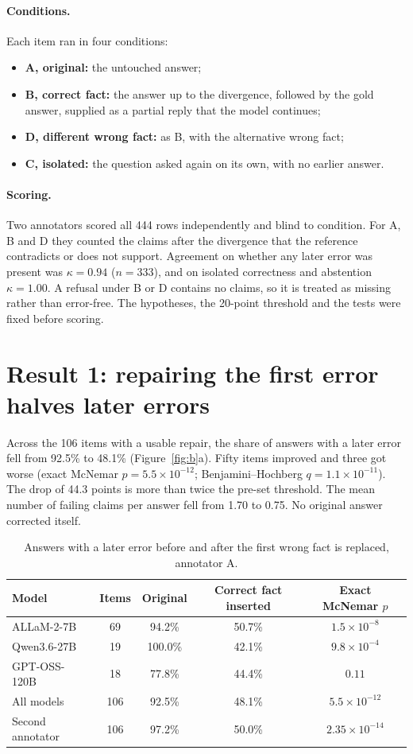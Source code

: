 \documentclass[11pt,a4paper,oneside]{report}
\newcommand{\sci}[2]{#1\times10^{#2}}
\begin{document}
\paragraph{Conditions.} Each item ran in four conditions:
\begin{itemize}
\item \textbf{A, original:} the untouched answer;
\item \textbf{B, correct fact:} the answer up to the divergence, followed by the gold answer, supplied as a partial reply that the model continues;
\item \textbf{D, different wrong fact:} as B, with the alternative wrong fact;
\item \textbf{C, isolated:} the question asked again on its own, with no earlier answer.
\end{itemize}

\paragraph{Scoring.} Two annotators scored all 444 rows independently and blind to condition. For A, B and D they counted the claims after the divergence that the reference contradicts or does not support. Agreement on whether any later error was present was $\kappa=0.94$ ($n=333$), and on isolated correctness and abstention $\kappa=1.00$. A refusal under B or D contains no claims, so it is treated as missing rather than error-free. The hypotheses, the 20-point threshold and the tests were fixed before scoring.

\section{Result 1: repairing the first error halves later errors}
Across the 106 items with a usable repair, the share of answers with a later error fell from 92.5\% to 48.1\% (Figure~\ref{fig:b}a). Fifty items improved and three got worse (exact McNemar $p=\sci{5.5}{-12}$; Benjamini--Hochberg $q=\sci{1.1}{-11}$). The drop of 44.3 points is more than twice the pre-set threshold. The mean number of failing claims per answer fell from 1.70 to 0.75. No original answer corrected itself.

\begin{table}[h]
\centering\small
\caption{Answers with a later error before and after the first wrong fact is replaced, annotator A.}
\label{tab:b}
\begin{tabular}{@{}lcccc@{}}
\toprule
Model & Items & Original & Correct fact inserted & Exact McNemar $p$\\
\midrule
ALLaM-2-7B & 69 & 94.2\% & 50.7\% & $\sci{1.5}{-8}$\\
Qwen3.6-27B & 19 & 100.0\% & 42.1\% & $\sci{9.8}{-4}$\\
GPT-OSS-120B & 18 & 77.8\% & 44.4\% & $0.11$\\
\midrule
All models & 106 & 92.5\% & 48.1\% & $\sci{5.5}{-12}$\\
Second annotator & 106 & 97.2\% & 50.0\% & $\sci{2.35}{-14}$\\
\bottomrule
\end{tabular}
\end{table}
\end{document}
